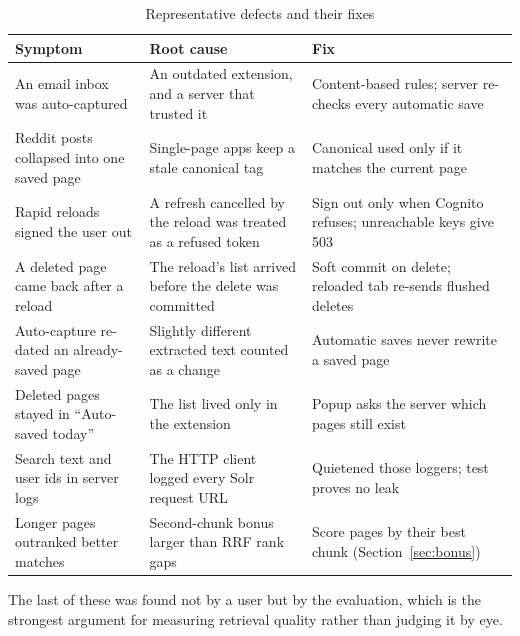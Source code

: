 \begin{table}[!htbp]
\centering
\small
\begin{tabularx}{\textwidth}{p{} L L}
\toprule
\textbf{Symptom} & \textbf{Root cause} & \textbf{Fix} \\
\midrule
An email inbox was auto-captured & An outdated extension, and a server that trusted it & Content-based rules; server re-checks every automatic save \\
Reddit posts collapsed into one saved page & Single-page apps keep a stale canonical tag & Canonical used only if it matches the current page \\
Rapid reloads signed the user out & A refresh cancelled by the reload was treated as a refused token & Sign out only when Cognito refuses; unreachable keys give 503 \\
A deleted page came back after a reload & The reload's list arrived before the delete was committed & Soft commit on delete; reloaded tab re-sends flushed deletes \\
Auto-capture re-dated an already-saved page & Slightly different extracted text counted as a change & Automatic saves never rewrite a saved page \\
Deleted pages stayed in ``Auto-saved today'' & The list lived only in the extension & Popup asks the server which pages still exist \\
Search text and user ids in server logs & The HTTP client logged every Solr request URL & Quietened those loggers; test proves no leak \\
Longer pages outranked better matches & Second-chunk bonus larger than RRF rank gaps & Score pages by their best chunk (Section~\ref{sec:bonus}) \\
\bottomrule
\end{tabularx}
\caption{Representative defects and their fixes}
\label{tab:bugs}
\end{table}

The last of these was found not by a user but by the evaluation, which is
the strongest argument for measuring retrieval quality rather than judging it
by eye.
